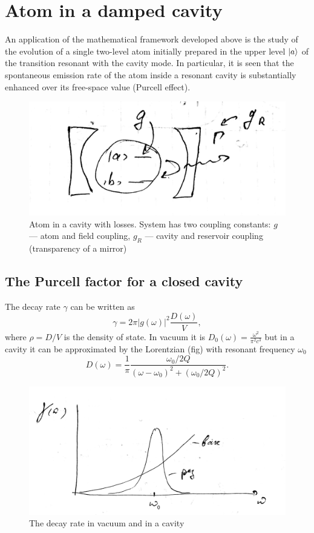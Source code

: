 \section{Atom in a damped cavity}

An application of the mathematical framework developed above is the study of the evolution of a single two-level atom initially prepared in the upper level $\left\lvert {a} \right\rangle$ of the transition resonant with the cavity mode. In particular, it is seen that the spontaneous emission rate of the atom inside a resonant cavity is substantially enhanced over its free-space value (Purcell effect).

\begin{figure}[h!]
	\centering
	\includegraphics[width=0.4\linewidth]{fig/L10/atom_in_R}
	\caption{Atom in a cavity with losses. System has two coupling constants: $g$ --- atom and field coupling, $g_R$ --- cavity and reservoir coupling (transparency of a mirror)}
	\label{fig:atominr}
\end{figure}

\subsection{The Purcell factor for a closed cavity}

The decay rate $\gamma$ can be written as
\begin{equation}
	\gamma = 2 \pi \left| g(\omega) \right|^2 \frac{D(\omega)}{V},
	\label{eq:gamma}
\end{equation}
where $\rho = D/V$ is the density of state. In vacuum it is $D_0(\omega) = \frac{\omega^2}{\pi^2 c^3}$ but in a cavity it can be approximated by the Lorentzian (fig) with resonant frequency $\omega_0$
\begin{equation}
	D(\omega) = \frac{1}{\pi} \frac{\omega_{0}/2Q}{(\omega - \omega_{0})^2 + \left( \omega_{0}/2Q \right)^2}.
\end{equation}

\begin{figure}
	\centering
	\includegraphics[width=0.5\linewidth]{fig/L10/gamma}
	\caption{The decay rate in vacuum and in a cavity}
	\label{fig:gamma}
\end{figure}

